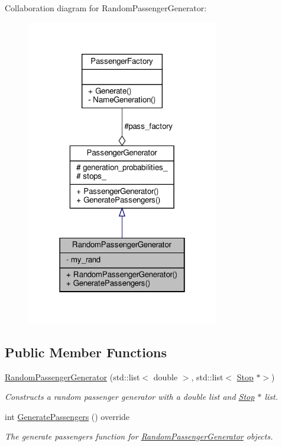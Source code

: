 Collaboration diagram for Random\+Passenger\+Generator\+:\nopagebreak
\begin{figure}[H]
\begin{center}
\leavevmode
\includegraphics[width=238pt]{classRandomPassengerGenerator__coll__graph}
\end{center}
\end{figure}
\subsection*{Public Member Functions}
\begin{DoxyCompactItemize}
\item 
\hyperlink{classRandomPassengerGenerator_a1be1b4abfe82bfe95eb0a078d9a3342d}{Random\+Passenger\+Generator} (std\+::list$<$ double $>$, std\+::list$<$ \hyperlink{classStop}{Stop} $\ast$$>$)
\begin{DoxyCompactList}\small\item\em Constructs a random passenger generator with a double list and \hyperlink{classStop}{Stop} $\ast$ list. \end{DoxyCompactList}\item 
int \hyperlink{classRandomPassengerGenerator_aba2d80cde33371cf9c3d033f1b8ba6b8}{Generate\+Passengers} () override
\begin{DoxyCompactList}\small\item\em The generate passengers function for \hyperlink{classRandomPassengerGenerator}{Random\+Passenger\+Generator} objects. \end{DoxyCompactList}\end{DoxyCompactItemize}
